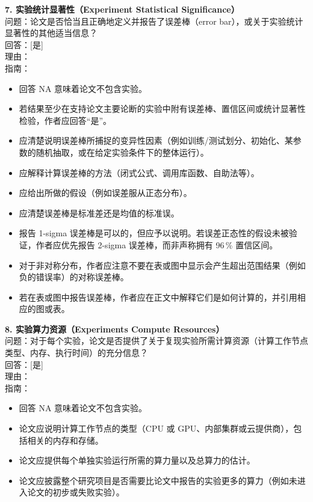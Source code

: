 \documentclass[11pt,UTF8,fontset=fandol]{ctexart}
\begin{document}
\textbf{7. 实验统计显著性（Experiment Statistical Significance）}\\
问题：论文是否恰当且正确地定义并报告了误差棒（error bar），或关于实验统计显著性的其他适当信息？\\
回答：[是]\\
理由：\\
指南：
\begin{itemize}[leftmargin=1.5em,itemsep=1pt]
\item 回答 NA 意味着论文不包含实验。
\item 若结果至少在支持论文主要论断的实验中附有误差棒、置信区间或统计显著性检验，作者应回答“是”。
\item 应清楚说明误差棒所捕捉的变异性因素（例如训练/测试划分、初始化、某参数的随机抽取，或在给定实验条件下的整体运行）。
\item 应解释计算误差棒的方法（闭式公式、调用库函数、自助法等）。
\item 应给出所做的假设（例如误差服从正态分布）。
\item 应清楚误差棒是标准差还是均值的标准误。
\item 报告 1-sigma 误差棒是可以的，但应予以说明。若误差正态性的假设未被验证，作者应优先报告 2-sigma 误差棒，而非声称拥有 96\,\% 置信区间。
\item 对于非对称分布，作者应注意不要在表或图中显示会产生超出范围结果（例如负的错误率）的对称误差棒。
\item 若在表或图中报告误差棒，作者应在正文中解释它们是如何计算的，并引用相应的图或表。
\end{itemize}

\textbf{8. 实验算力资源（Experiments Compute Resources）}\\
问题：对于每个实验，论文是否提供了关于复现实验所需计算资源（计算工作节点类型、内存、执行时间）的充分信息？\\
回答：[是]\\
理由：\\
指南：
\begin{itemize}[leftmargin=1.5em,itemsep=1pt]
\item 回答 NA 意味着论文不包含实验。
\item 论文应说明计算工作节点的类型（CPU 或 GPU、内部集群或云提供商），包括相关的内存和存储。
\item 论文应提供每个单独实验运行所需的算力量以及总算力的估计。
\item 论文应披露整个研究项目是否需要比论文中报告的实验更多的算力（例如未进入论文的初步或失败实验）。
\end{itemize}
\end{document}
